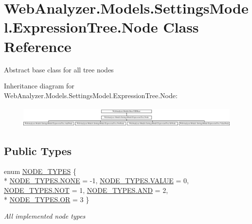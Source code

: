 \hypertarget{class_web_analyzer_1_1_models_1_1_settings_model_1_1_expression_tree_1_1_node}{}\section{Web\+Analyzer.\+Models.\+Settings\+Model.\+Expression\+Tree.\+Node Class Reference}
\label{class_web_analyzer_1_1_models_1_1_settings_model_1_1_expression_tree_1_1_node}


Abstract base class for all tree nodes  


Inheritance diagram for Web\+Analyzer.\+Models.\+Settings\+Model.\+Expression\+Tree.\+Node\+:\begin{figure}[H]
\begin{center}
\leavevmode
\includegraphics[height=1.096606cm]{class_web_analyzer_1_1_models_1_1_settings_model_1_1_expression_tree_1_1_node}
\end{center}
\end{figure}
\subsection*{Public Types}
\begin{DoxyCompactItemize}
\item 
enum \hyperlink{class_web_analyzer_1_1_models_1_1_settings_model_1_1_expression_tree_1_1_node_a89c72b19ff778cbc04788f4cb47a730e}{N\+O\+D\+E\+\_\+\+T\+Y\+P\+E\+S} \{ \\*
\hyperlink{class_web_analyzer_1_1_models_1_1_settings_model_1_1_expression_tree_1_1_node_a89c72b19ff778cbc04788f4cb47a730eab50339a10e1de285ac99d4c3990b8693}{N\+O\+D\+E\+\_\+\+T\+Y\+P\+E\+S.\+N\+O\+N\+E} = -\/1, 
\hyperlink{class_web_analyzer_1_1_models_1_1_settings_model_1_1_expression_tree_1_1_node_a89c72b19ff778cbc04788f4cb47a730eaecc2e9c313faddb07e7da223c1dc5c3f}{N\+O\+D\+E\+\_\+\+T\+Y\+P\+E\+S.\+V\+A\+L\+U\+E} = 0, 
\hyperlink{class_web_analyzer_1_1_models_1_1_settings_model_1_1_expression_tree_1_1_node_a89c72b19ff778cbc04788f4cb47a730ea10df3d67626099df882920ba6552f16d}{N\+O\+D\+E\+\_\+\+T\+Y\+P\+E\+S.\+N\+O\+T} = 1, 
\hyperlink{class_web_analyzer_1_1_models_1_1_settings_model_1_1_expression_tree_1_1_node_a89c72b19ff778cbc04788f4cb47a730ea558ffc8f5770d8e4f95f51d822685532}{N\+O\+D\+E\+\_\+\+T\+Y\+P\+E\+S.\+A\+N\+D} = 2, 
\\*
\hyperlink{class_web_analyzer_1_1_models_1_1_settings_model_1_1_expression_tree_1_1_node_a89c72b19ff778cbc04788f4cb47a730ea1d00e7dce692e8dc3f6877f035e3a616}{N\+O\+D\+E\+\_\+\+T\+Y\+P\+E\+S.\+O\+R} = 3
 \}\begin{DoxyCompactList}\small\item\em All implemented node types \end{DoxyCompactList}
\end{DoxyCompactItemize}
